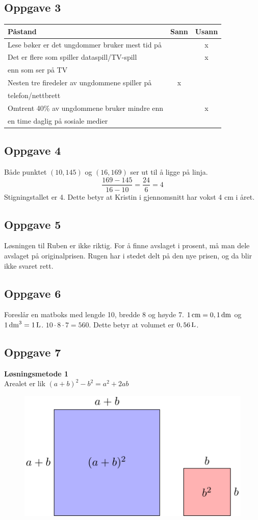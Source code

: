 \subsection*{Oppgave 3}
\begin{tabular}{l|c|c}
\textbf{Påstand} & \textbf{Sann} & \textbf{Usann} \\ \hline
Lese bøker er det ungdommer bruker mest tid på & & x	\\ \hline 
Det er flere som spiller dataspill/TV-spill & & x \\ 
enn som ser på TV & &\\ \hline
Nesten tre firedeler av ungdommene spiller på & x & \\
telefon/nettbrett& &\\ \hline
Omtrent 40\% av ungdommene bruker mindre enn & & x \\
en time daglig på sosiale medier & &
\end{tabular}


\subsection*{Oppgave 4}
Både punktet $ (10, 145) $ og $ (16, 169) $ ser ut til å ligge på linja.
\[ \frac{169-145}{16-10}=\frac{24}{6}=4 \]
Stigningstallet er 4. Dette betyr at Kristin i gjennomsnitt har vokst 4 cm i året.

\subsection*{Oppgave 5}
Løsningen til Ruben er ikke riktig. For å finne avslaget i prosent, må man dele avslaget på originalprisen. Rugen har i stedet delt på den nye prisen, og da blir ikke svaret rett.

\subsection*{Oppgave 6}
Foreslår en matboks med lengde 10, bredde 8 og høyde 7. $ 1\,\textrm{cm}=0,1\,\textrm{dm} $ og $ 1\,\textrm{dm}^3=1\,\textrm{L} $. $ 10\cdot8\cdot7=560 $. Dette betyr at volumet er $ 0,56\,\textrm{L} $.

\newpage
\subsection*{Oppgave 7}
\textbf{Løsningsmetode 1} \\
Arealet er lik $ (a+b)^2-b^2=a^2+2ab $
\begin{figure}
	\includegraphics[]{opg7d1_a}
\end{figure}

